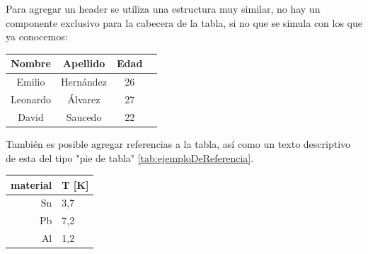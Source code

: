 \documentclass[12pt,letterpaper,oneside]{article}
\begin{document}
\begin{multicols}{2}

Para agregar un header se utiliza una estructura muy similar, no hay un componente exclusivo para la cabecera de la tabla, si no que se simula con los que ya conocemos:



\begin{center}
 \begin{tabular}{||c | c | c | c||} 
 
 \hline
   Nombre & Apellido & Edad  \\ [0.5ex] 
 \hline \hline
 Emilio & Hernández & 26  \\ 
 \hline
 Leonardo & Álvarez & 27 \\
 \hline
 David & Saucedo & 22 \\
 \hline
\end{tabular}
\end{center}


También es posible agregar referencias a la tabla, así como un texto descriptivo de esta del tipo "pie de tabla" \ref{tab:ejemploDeReferencia}.

\begin{center}
  
  \begin{tabular}{r | l}
    material  & T [K]\\
    \hline
    Sn & 3,7 \\
    Pb & 7,2 \\
    Al & 1,2\\
  \end{tabular}
\end{center}



\end{multicols}
\end{document}
